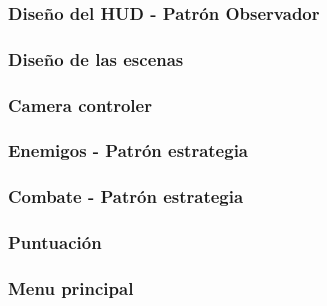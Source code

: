 \subsubsection{Diseño del HUD - Patrón Observador}

\subsubsection{Diseño de las escenas}

\subsubsection{Camera controler}

\subsubsection{Enemigos - Patrón estrategia}

\subsubsection{Combate - Patrón estrategia}

\subsubsection{Puntuación}

\subsubsection{Menu principal}







